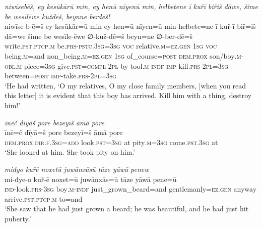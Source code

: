 \ea \label{KŠ.72}
\textit{niwīsebēš, ey kesūkārū min, ey henū nīyenū min, heɫbetene ī kuřī biřiš dāwe, šime be wesīlēwe kuždēš, beynne berdēš!} \\ 
\gll niwīse b-ē=š ey kesūkār=ū min ey hen=ū nīyen=ū min heɫbete=ne ī kuř-ī biř=iš dā=we šime be wesīle-ēwe ∅-kuž-dē=š beyn=ne ∅-ber-dē=š \\ 
 write\textsc{.pst}\textsc{.ptcp}\textsc{.m} be\textsc{.prs}\textsc{-pstc}\textsc{.3sg}\textsc{=3sg} \textsc{voc} relative\textsc{.m}\textsc{\textsc{=ez.gen}} \textsc{1sg} \textsc{voc} being\textsc{.m}=and non\_being\textsc{.m}\textsc{\textsc{=ez.gen}} \textsc{1sg} of\_course\textsc{=\textsc{post}} \textsc{dem.prox} son/boy\textsc{.m}\textsc{-obl}\textsc{.m} piece\textsc{=3sg} give\textsc{.pst}\textsc{=compl} \textsc{2pl} by tool\textsc{.m}\textsc{-indf} \textsc{imp-}kill\textsc{.prs}-\textsc{2pl}\textsc{=3sg} between\textsc{=\textsc{post}} \textsc{imp-}take\textsc{.prs}-\textsc{2pl}\textsc{=3sg} \\ 
\glt `He had written, ‘O my relatives, O my close family members, [when you read this letter] it is evident that this boy has arrived. Kill him with a thing, destroy him!'
\z 
 
\ea \label{KŠ.73}
\textit{īnēč dīyāš pore bezeyīš āmā pore} \\ 
\gll īnē=č dīyā=š pore bezeyī=š āmā pore \\ 
 \textsc{dem.prox}\textsc{.dir}\textsc{.f}\textsc{.3sg}\textsc{=add} look\textsc{.pst}\textsc{=3sg} at pity\textsc{.m}\textsc{=3sg} come\textsc{.pst}\textsc{.3sg} at \\ 
\glt `She looked at him. She took pity on him.'
\z 
 
\ea \label{KŠ.74}
\textit{miđyo kuřē noxetū juwānxāsū tāze yāwā penew} \\ 
\gll mi-đye-o kuř-ē noxet=ū juwānxās=ū tāze yāwā pene=ū \\ 
 \textsc{ind-}look\textsc{.prs}\textsc{-3sg} boy\textsc{.m}\textsc{-indf} just\_grown\_beard=and gentlemanly\textsc{\textsc{=ez.gen}} anyway arrive\textsc{.pst}\textsc{.ptcp}\textsc{.m} to=and \\ 
\glt `She saw that he had just grown a beard; he was beautiful, and he had just hit puberty.'
\z 
 
